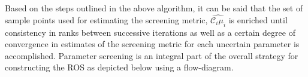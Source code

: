 %
%

Based on the steps outlined in the above algorithm, it can be said that the set of sample points used for
estimating the screening metric, $\widehat{\mathcal{C}_i\mu_i}$ is enriched until consistency in ranks
between successive iterations as well as a certain degree of convergence in estimates of the screening 
metric for each uncertain parameter is accomplished. Parameter
screening is an integral part of the overall strategy for constructing the ROS as 
depicted below using a flow-diagram. 

\bigskip



